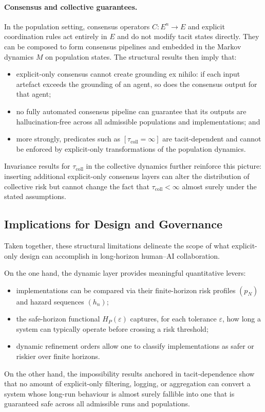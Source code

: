 \documentclass[11pt]{article}
\theoremstyle{definition}
\begin{document}
\paragraph{Consensus and collective guarantees.}
In the population setting, consensus operators $C : E^n \to E$ and explicit coordination rules act entirely in $E$ and do not modify tacit states directly. They can be composed to form consensus pipelines and embedded in the Markov dynamics $M$ on population states. The structural results then imply that:
\begin{itemize}
  \item explicit-only consensus cannot create grounding ex nihilo: if each input artefact exceeds the grounding of an agent, so does the consensus output for that agent;
  \item no fully automated consensus pipeline can guarantee that its outputs are hallucination-free across all admissible populations and implementations; and
  \item more strongly, predicates such as $[\tau_{\mathrm{coll}} = \infty]$ are tacit-dependent and cannot be enforced by explicit-only transformations of the population dynamics.
\end{itemize}
Invariance results for $\tau_{\mathrm{coll}}$ in the collective dynamics further reinforce this picture: inserting additional explicit-only consensus layers can alter the distribution of collective risk but cannot change the fact that $\tau_{\mathrm{coll}} < \infty$ almost surely under the stated assumptions.

\subsection{Implications for Design and Governance}

Taken together, these structural limitations delineate the scope of what explicit-only design can accomplish in long-horizon human--AI collaboration.

On the one hand, the dynamic layer provides meaningful quantitative levers:
\begin{itemize}
  \item implementations can be compared via their finite-horizon risk profiles $(p_N)$ and hazard sequences $(h_n)$;
  \item the safe-horizon functional $H_P(\varepsilon)$ captures, for each tolerance $\varepsilon$, how long a system can typically operate before crossing a risk threshold;
  \item dynamic refinement orders allow one to classify implementations as safer or riskier over finite horizons.
\end{itemize}
On the other hand, the impossibility results anchored in tacit-dependence show that no amount of explicit-only filtering, logging, or aggregation can convert a system whose long-run behaviour is almost surely fallible into one that is guaranteed safe across all admissible runs and populations.
\end{document}
